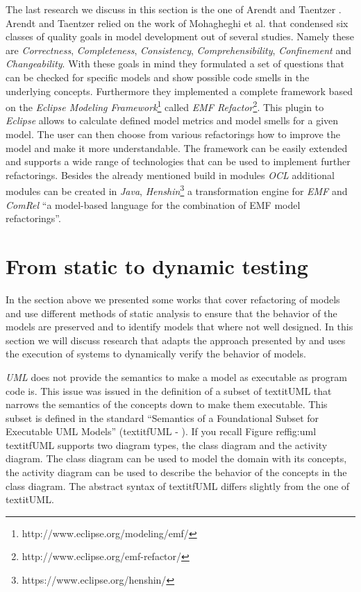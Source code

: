\documentclass{llncs}
\begin{document}
The last research we discuss in this section is the one of Arendt and Taentzer \cite{DBLP:conf/models/ArendtTW13}.
Arendt and Taentzer relied on the work of Mohagheghi et al. \cite{DBLP:journals/infsof/MohagheghiDN09} that condensed
six classes of quality goals in model development out of several studies. Namely these are \textit{Correctness},
\textit{Completeness}, \textit{Consistency}, \textit{Comprehensibility}, \textit{Confinement} and
\textit{Changeability}. With these goals in mind they formulated a set of questions that can be checked for specific
models and show possible code smells in the underlying concepts. Furthermore they implemented a complete framework based
on the \textit{Eclipse Modeling Framework}\footnote{http://www.eclipse.org/modeling/emf/} called \textit{EMF
Refactor}\footnote{http://www.eclipse.org/emf-refactor/}. This plugin to \textit{Eclipse} allows to calculate defined
model metrics and model smells for a given model. The user can then choose from various refactorings how to improve the
model and make it more understandable. The framework can be easily extended and supports a wide range of technologies
that can be used to implement further refactorings. Besides the already mentioned build in modules \textit{OCL}
additional modules can be created in \textit{Java}, \textit{Henshin}\footnote{https://www.eclipse.org/henshin/} a
transformation engine for \textit{EMF} and \textit{ComRel} ``a model-based language for the combination of EMF model
refactorings''.

\section{From static to dynamic testing}
\label{sec:todynamics}

In the section above we presented some works that cover refactoring of models and use different methods of static
analysis to ensure that the behavior of the models are preserved and to identify models that where not well designed. In
this section we will discuss research that adapts the approach presented by \cite{rob99} and uses the execution of
systems to dynamically verify the behavior of models.

\textit{UML} does not provide the semantics to make a model as executable as program code is. This issue was issued in
the definition of a subset of textit{UML} that narrows the semantics of the concepts down to make them executable. This
subset is defined in the standard ``Semantics of a Foundational Subset for Executable UML Models'' (textit{fUML} -
\cite{man:FUML}). If you recall Figure ref{fig:uml} textit{fUML} supports two diagram types, the class diagram and the
activity diagram. The class diagram can be used to model the domain with its concepts, the activity diagram can be used
to describe the behavior of the concepts in the class diagram. The abstract syntax of textit{fUML} differs slightly
from the one of textit{UML}.
\end{document}
